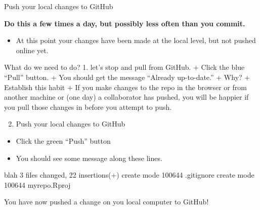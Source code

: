 \documentclass[
  ignorenonframetext,
]{beamer}
\newenvironment{Shaded}{\begin{snugshade}}{\end{snugshade}}
\newcommand{\ExtensionTok}[1]{#1}
\newcommand{\NormalTok}[1]{#1}
\providecommand{\tightlist}{%
  \setlength{\itemsep}{0pt}\setlength{\parskip}{0pt}}
\begin{document}
\begin{frame}[fragile]{Push your local changes to GitHub}
\protect\hypertarget{push-your-local-changes-to-github}{}

\textbf{Do this a few times a day, but possibly less often than you
commit.}

\begin{itemize}
\tightlist
\item
  At this point your changes have been made at the local level, but not
  pushed online yet.
\end{itemize}

What do we need to do? 1. let's stop and pull from GitHub. + Click the
blue ``Pull'' button. + You should get the message ``Already
up-to-date.'' + Why? + Establish this habit + If you make changes to the
repo in the browser or from another machine or (one day) a collaborator
has pushed, you will be happier if you pull those changes in before you
attempt to push.

\begin{enumerate}
\setcounter{enumi}{1}
\tightlist
\item
  Push your local changes to GitHub
\end{enumerate}

\begin{itemize}
\tightlist
\item
  Click the green ``Push'' button\\
\item
  You should see some message along these lines.
\end{itemize}

\begin{Shaded}
\begin{Highlighting}[]
\NormalTok{[}\ExtensionTok{master}\NormalTok{ dc671f0] blah}
 \ExtensionTok{3}\NormalTok{ files changed, 22 insertions(+)}
 \ExtensionTok{create}\NormalTok{ mode 100644 .gitignore}
 \ExtensionTok{create}\NormalTok{ mode 100644 myrepo.Rproj}
\end{Highlighting}
\end{Shaded}

You have now pushed a change on you local computer to GitHub!

\end{frame}
\end{document}
